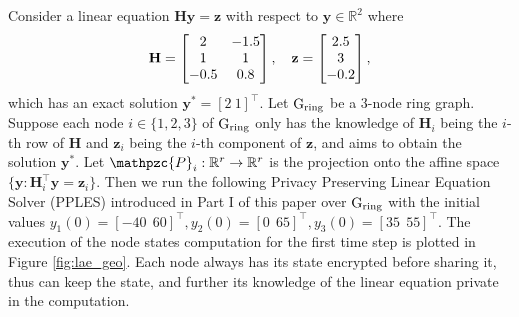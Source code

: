 \documentclass[a4paper, 11pt]{article}
\newcommand{\R}{\mathbb{R}}
\newcommand{\1}{\mathbf{1}}
\newcommand{\yb}{\mathbf{y}}
\newcommand{\zb}{\mathbf{z}}
\newcommand{\Hb}{\mathbf{H}}
\newcommand{\mG}{\mathrm{G}}
\begin{document}
 Consider a linear equation $\Hb\yb=\zb$ with respect to $\yb\in\R^2$ where
\begin{equation}\notag
\Hb=
\begin{bmatrix}
2 & -1.5 \\
1 & 1 \\
-0.5 & 0.8
\end{bmatrix},\quad
\zb=
\begin{bmatrix}
2.5\\
3\\
-0.2
\end{bmatrix},
\end{equation}
which has an exact solution $\yb^\ast=[2\ 1]^\top$. Let $\mG_{\rm ring}$ be a $3$-node ring graph. Suppose each node $i\in\{1,2,3\}$ of $\mG_{\rm ring}$ only has the knowledge of $\Hb_i$ being the $i$-th row of $\Hb$ and $\zb_i$ being the $i$-th component of $\zb$, and aims to obtain the solution $\yb^\ast$.  Let $\mathpzc{P}_i:\R^r\to\R^r$ is the projection onto the affine space $\{\yb:\Hb_i^\top\yb=\zb_i\}$.  Then we run the following Privacy Preserving Linear Equation Solver (PPLES) introduced in Part I of this paper over $\mG_{\rm ring}$ with the initial values $y_1(0)=[-40\ \ 60]^\top, y_2(0)=[0\ \ 65]^\top, y_3(0)=[35\ \ 55]^\top$. The execution of the node states computation for the first time step is plotted in Figure \ref{fig:lae_geo}.
{Each node always has its state encrypted before sharing it, thus can keep the state, and further its knowledge of the linear equation private in the computation.}
\end{document}
